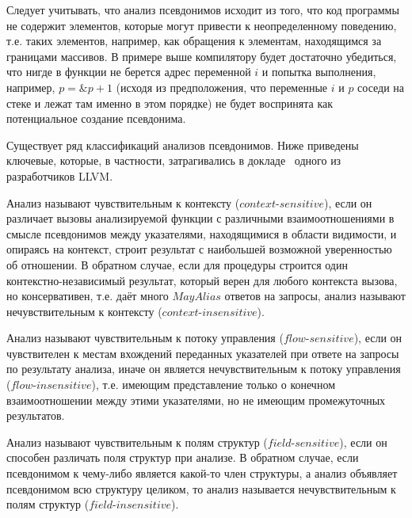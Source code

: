 \begin{myremark}
Следует учитывать, что анализ псевдонимов исходит из того, что код программы не содержит элементов, которые могут привести к неопределенному поведению, т.е. таких элементов, например, как обращения к элементам, находящимся за границами массивов. В примере выше компилятору будет достаточно убедиться, что нигде в функции не берется адрес переменной $i$ и попытка выполнения, например, $p = \&p + 1$ (исходя из предположения, что переменные $i$ и $p$ соседи на стеке и лежат там именно в этом порядке) не будет воспринята как потенциальное создание псевдонима.
\end{myremark}


Существует ряд классификаций анализов псевдонимов. Ниже приведены ключевые, которые, в частности, затрагивались в докладе~\autocite{GohmanAAinLLVM} одного из разработчиков LLVM.

\begin{mydefinition}
Анализ называют чувствительным к контексту ($context$-$sensitive$), если он различает вызовы анализируемой функции с различными взаимоотношениями в смысле псевдонимов между указателями, находящимися в области видимости, и опираясь на контекст, строит результат с наибольшей возможной уверенностью об отношении. В обратном случае, если для процедуры строится один контекстно-независимый результат, который верен для любого контекста вызова, но консервативен, т.е. даёт много $MayAlias$ ответов на запросы, анализ называют нечувствительным к контексту ($context$-$insensitive$).
\end{mydefinition}

\begin{mydefinition}
Анализ называют чувствительным к потоку управления ($flow$-$sensitive$), если он чувствителен к местам вхождений переданных указателей при ответе на запросы по результату анализа, иначе он является нечувствительным к потоку управления ($flow$-$insensitive$), т.е. имеющим представление только о конечном взаимоотношении между этими указателями, но не имеющим промежуточных результатов.
\end{mydefinition}

\begin{mydefinition}
Анализ называют чувствительным к полям структур ($field$-$sensitive$), если он способен различать поля структур при анализе. В обратном случае, если псевдонимом к чему-либо является какой-то член структуры, а анализ объявляет псевдонимом всю структуру целиком, то анализ называется нечувствительным к полям структур ($field$-$insensitive$).
\end{mydefinition}


